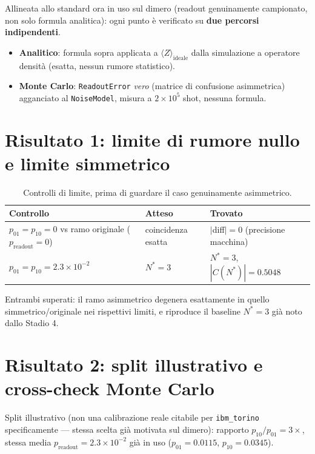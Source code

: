 \documentclass[11pt,a4paper]{article}
\begin{document}
Allineata allo standard ora in uso sul dimero (readout genuinamente campionato, non solo formula
analitica): ogni punto è verificato su \textbf{due percorsi indipendenti}.
\begin{itemize}[nosep]
  \item \textbf{Analitico}: formula sopra applicata a $\langle Z\rangle_\text{ideale}$ dalla
  simulazione a operatore densità (esatta, nessun rumore statistico).
  \item \textbf{Monte Carlo}: \texttt{ReadoutError} \emph{vero} (matrice di confusione
  asimmetrica) agganciato al \texttt{NoiseModel}, misura a $2\times10^5$ shot, nessuna formula.
\end{itemize}

\section{Risultato 1: limite di rumore nullo e limite simmetrico}

\begin{table}[htbp]
\centering
\caption{Controlli di limite, prima di guardare il caso genuinamente asimmetrico.}
\begin{tabular}{p{5.7cm}p{3.7cm}p{4.3cm}}
\toprule
Controllo & Atteso & Trovato \\
\midrule
$p_{01}=p_{10}=0$ vs ramo originale ($p_\text{readout}=0$) & coincidenza esatta & $|$diff$|=0$ (precisione macchina) \\
$p_{01}=p_{10}=2.3\times10^{-2}$ & $N^*=3$ & $N^*=3$, $|C(N^*)|=0.5048$ \\
\bottomrule
\end{tabular}
\end{table}

Entrambi superati: il ramo asimmetrico degenera esattamente in quello simmetrico/originale nei
rispettivi limiti, e riproduce il baseline $N^*=3$ già noto dallo Stadio 4.

\section{Risultato 2: split illustrativo e cross-check Monte Carlo}

Split illustrativo (non una calibrazione reale citabile per \texttt{ibm\_torino} specificamente
--- stessa scelta già motivata sul dimero): rapporto $p_{10}/p_{01}=3\times$, stessa media
$p_\text{readout}=2.3\times10^{-2}$ già in uso ($p_{01}=0.0115$, $p_{10}=0.0345$).
\end{document}
